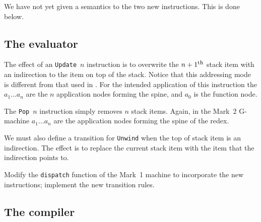 We have not yet given a semantics to the two new instructions. This is
done below.

\subsection{The evaluator}
\label{gm:sc:eval2}

The effect of an \mbox{\tt Update}~$n$ instruction is to overwrite the
$n+1^{\mbox{\footnotesize th}}$ stack item with an indirection to the
item on top of the stack. Notice that this addressing mode is
different from that used in \cite{PJBook}. For the intended application
of this instruction the $a_1\ldots a_n$ are the $n$ application nodes
forming the spine, and $a_0$ is the function node.

\gmrule%
{}%
{}

The \mbox{\tt Pop}~$n$ instruction simply removes $n$ stack items.
Again, in the Mark~2 G-machine $a_1\ldots a_n$ are the application
nodes forming the spine of the redex.

\gmrule%
{}%
{}

We must also define a transition for \mbox{\tt Unwind} when the top of stack
item is an indirection. The effect is to replace the current stack
item with the item that the indirection points to.

\gmrule%
{}%
{}

\begin{exercise}\label{gm:X:step2}
Modify the \mbox{\tt dispatch} function of the Mark~1 machine to incorporate the new
instructions; implement the new transition rules.
\end{exercise}

\subsection{The compiler}
\label{gm:sc:compiler2}

